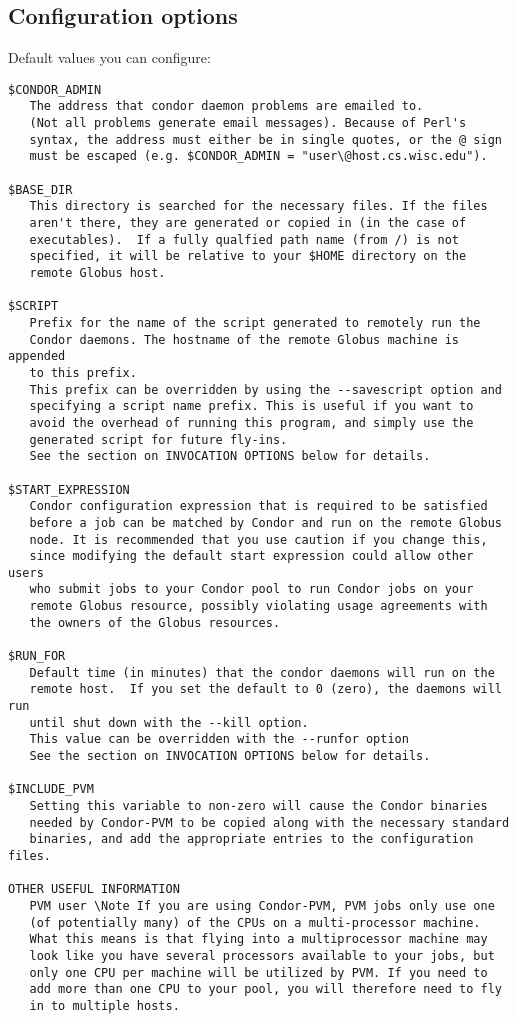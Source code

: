 \subsection{Configuration options}
Default values you can configure:
\begin{verbatim}
$CONDOR_ADMIN
   The address that condor daemon problems are emailed to.
   (Not all problems generate email messages). Because of Perl's
   syntax, the address must either be in single quotes, or the @ sign
   must be escaped (e.g. $CONDOR_ADMIN = "user\@host.cs.wisc.edu").

$BASE_DIR
   This directory is searched for the necessary files. If the files
   aren't there, they are generated or copied in (in the case of
   executables).  If a fully qualfied path name (from /) is not
   specified, it will be relative to your $HOME directory on the
   remote Globus host.

$SCRIPT
   Prefix for the name of the script generated to remotely run the
   Condor daemons. The hostname of the remote Globus machine is appended
   to this prefix.
   This prefix can be overridden by using the --savescript option and
   specifying a script name prefix. This is useful if you want to
   avoid the overhead of running this program, and simply use the
   generated script for future fly-ins.
   See the section on INVOCATION OPTIONS below for details.

$START_EXPRESSION
   Condor configuration expression that is required to be satisfied
   before a job can be matched by Condor and run on the remote Globus
   node. It is recommended that you use caution if you change this,
   since modifying the default start expression could allow other users
   who submit jobs to your Condor pool to run Condor jobs on your
   remote Globus resource, possibly violating usage agreements with
   the owners of the Globus resources.

$RUN_FOR
   Default time (in minutes) that the condor daemons will run on the
   remote host.  If you set the default to 0 (zero), the daemons will run
   until shut down with the --kill option.
   This value can be overridden with the --runfor option
   See the section on INVOCATION OPTIONS below for details.

$INCLUDE_PVM
   Setting this variable to non-zero will cause the Condor binaries
   needed by Condor-PVM to be copied along with the necessary standard
   binaries, and add the appropriate entries to the configuration files.

OTHER USEFUL INFORMATION
   PVM user \Note If you are using Condor-PVM, PVM jobs only use one
   (of potentially many) of the CPUs on a multi-processor machine.
   What this means is that flying into a multiprocessor machine may
   look like you have several processors available to your jobs, but
   only one CPU per machine will be utilized by PVM. If you need to
   add more than one CPU to your pool, you will therefore need to fly
   in to multiple hosts.
\end{verbatim}

